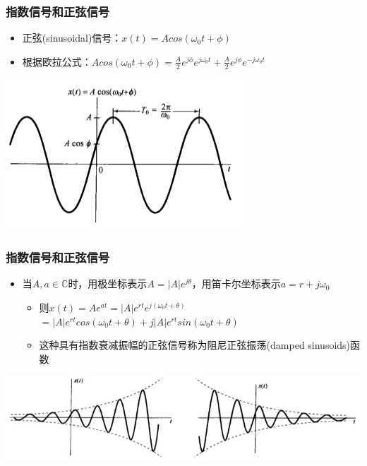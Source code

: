 \documentclass[CJKutf8,dvipsnames,table]{beamer}
\begin{document}
\begin{CJK*}{UTF8}{song}
  \begin{frame}
    \frametitle{指数信号和正弦信号}
    \begin{itemize}
    \item 正弦(sinusoidal)信号：$x(t)=Acos(\omega_0 t + \phi)$
    \item 根据欧拉公式：$Acos(\omega_0 t + \phi)=\frac{A}{2}e^{j\phi}e^{j\omega_0 t}+\frac{A}{2}e^{j\phi}e^{-j\omega_0 t}$
    \end{itemize}
    \begin{center}
      \includegraphics[scale=.5]{ccossinusoid}
    \end{center}  
  \end{frame} 

  \begin{frame}
    \frametitle{指数信号和正弦信号}
    \begin{itemize}
    \item 当$A, a \in \mathbb{C}$时，用极坐标表示$A=|A|e^{j\theta}$，用笛卡尔坐标表示$a=r+j\omega_0$
    \begin{itemize}
    \item 则$x(t)=Ae^{at}=|A|e^{rt}e^{j(\omega_0 t+\theta)}$
    \\ $=|A|e^{rt}cos(\omega_0 t + \theta)+j|A|e^{rt}sin(\omega_0 t + \theta)$
    \item 这种具有指数衰减振幅的正弦信号称为阻尼正弦振荡(damped sinusoids)函数
    \end{itemize}
    \end{itemize}
    \begin{center}
      \includegraphics[scale=.5]{dampedsinusoids}
    \end{center}  
  \end{frame} 


\end{CJK*}
\end{document}
